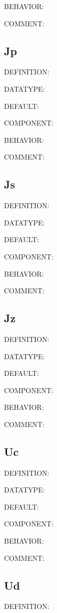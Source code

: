 {\color{purple}BEHAVIOR:}

{\color{olive}COMMENT:}

\subsection{Jp}
{\color{red}DEFINITION:}

{\color{green}DATATYPE:}

{\color{blue}DEFAULT:}

{\color{brown}COMPONENT:}

{\color{purple}BEHAVIOR:}

{\color{olive}COMMENT:}

\subsection{Js}
{\color{red}DEFINITION:}

{\color{green}DATATYPE:}

{\color{blue}DEFAULT:}

{\color{brown}COMPONENT:}

{\color{purple}BEHAVIOR:}

{\color{olive}COMMENT:}

\subsection{Jz}
{\color{red}DEFINITION:}

{\color{green}DATATYPE:}

{\color{blue}DEFAULT:}

{\color{brown}COMPONENT:}

{\color{purple}BEHAVIOR:}

{\color{olive}COMMENT:}

\subsection{Uc}
{\color{red}DEFINITION:}

{\color{green}DATATYPE:}

{\color{blue}DEFAULT:}

{\color{brown}COMPONENT:}

{\color{purple}BEHAVIOR:}

{\color{olive}COMMENT:}

\subsection{Ud}
{\color{red}DEFINITION:}

